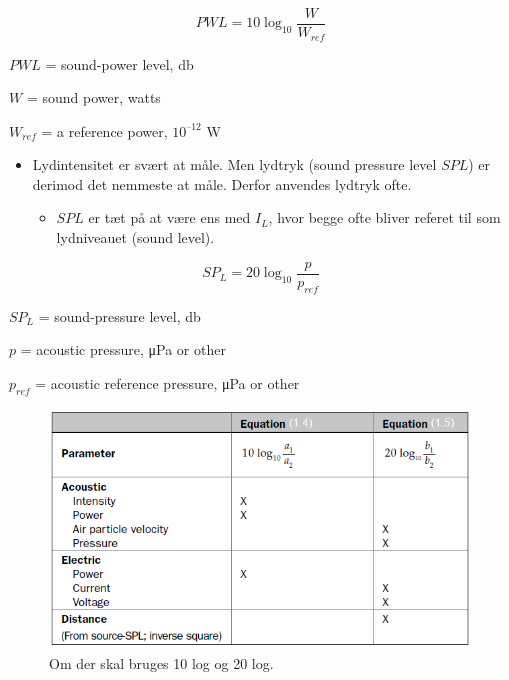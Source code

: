 \begin{equation}\label{eq:decibel}
PWL = 10\log_{10}\frac{W}{W_{ref}}
\end{equation}
\newpage
\begin{description}
	\item $PWL$ = sound-power level, \si{\decibel}
	\item $W$ = sound power, watts
	\item $W_{ref}$ = a reference power, $10^{–12}$ \si{\watt}
\end{description}

\begin{itemize}
	\item Lydintensitet er svært at måle. Men lydtryk (sound pressure level $SPL$) er derimod det nemmeste at måle. Derfor anvendes lydtryk ofte.
	\begin{itemize}
		\item $SPL$ er tæt på at være ens med $I_L$, hvor begge ofte bliver referet til som lydniveauet (sound level).
	\end{itemize}
\end{itemize}

\begin{equation}\label{eq:spl}
SP_L = 20\log_{10}\frac{p}{p_{ref}}
\end{equation}

\begin{description}
	\item $SP_L$ = sound-pressure level, \si{\decibel}
	\item $p$ = acoustic pressure, \si{\micro\pascal} or other
	\item $p_{ref}$ = acoustic reference pressure, \si{\micro\pascal}  or other
\end{description}

\begin{figure} [H]
	\centering
	\includegraphics[width=\linewidth]{graphics/6.png}
	\caption{Om der skal bruges 10 log og 20 log. }
	\label{fig:6}
\end{figure}


